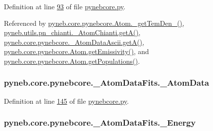 Definition at line \hyperlink{pynebcore_8py_source_l00093}{93} of file \hyperlink{pynebcore_8py_source}{pynebcore.\+py}.



Referenced by \hyperlink{pynebcore_8py_source_l01803}{pyneb.\+core.\+pynebcore.\+Atom.\+\_\+get\+Tem\+Den\+\_()}, \hyperlink{pn__chianti_8py_source_l00296}{pyneb.\+utils.\+pn\+\_\+chianti.\+\_\+\+Atom\+Chianti.\+get\+A()}, \hyperlink{pynebcore_8py_source_l00475}{pyneb.\+core.\+pynebcore.\+\_\+\+Atom\+Data\+Ascii.\+get\+A()}, \hyperlink{pynebcore_8py_source_l01716}{pyneb.\+core.\+pynebcore.\+Atom.\+get\+Emissivity()}, and \hyperlink{pynebcore_8py_source_l01496}{pyneb.\+core.\+pynebcore.\+Atom.\+get\+Populations()}.

\hypertarget{classpyneb_1_1core_1_1pynebcore_1_1___atom_data_fits_a778ab4d0dcd50a9d2f5aa54da07b51cc}{}
\subsubsection[{\+\_\+\+Atom\+Data}]{\setlength{\rightskip}{0pt plus 5cm}pyneb.\+core.\+pynebcore.\+\_\+\+Atom\+Data\+Fits.\+\_\+\+Atom\+Data\hspace{0.3cm}{\ttfamily [private]}}\label{classpyneb_1_1core_1_1pynebcore_1_1___atom_data_fits_a778ab4d0dcd50a9d2f5aa54da07b51cc}


Definition at line \hyperlink{pynebcore_8py_source_l00145}{145} of file \hyperlink{pynebcore_8py_source}{pynebcore.\+py}.

\hypertarget{classpyneb_1_1core_1_1pynebcore_1_1___atom_data_fits_a465451be78113fc2ee30cf3ddabceadf}{}
\subsubsection[{\+\_\+\+Energy}]{\setlength{\rightskip}{0pt plus 5cm}pyneb.\+core.\+pynebcore.\+\_\+\+Atom\+Data\+Fits.\+\_\+\+Energy\hspace{0.3cm}{\ttfamily [private]}}\label{classpyneb_1_1core_1_1pynebcore_1_1___atom_data_fits_a465451be78113fc2ee30cf3ddabceadf}


